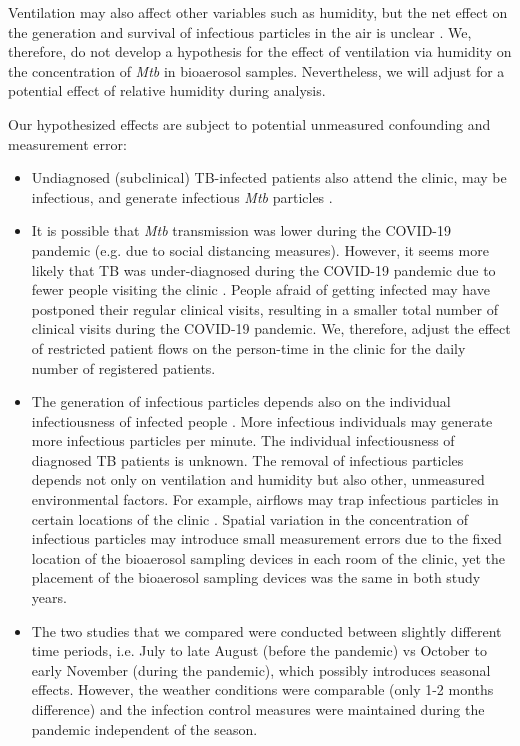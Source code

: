 \documentclass{article}
\begin{document}
Ventilation may also affect other variables such as humidity, but the net effect on the generation and survival of infectious particles in the air is unclear \cite{Wang2021Science}. We, therefore, do not develop a hypothesis for the effect of ventilation via humidity on the concentration of \emph{Mtb} in bioaerosol samples. Nevertheless, we will adjust for a potential effect of relative humidity during analysis.

Our hypothesized effects are subject to potential unmeasured confounding and measurement error: 

\begin{itemize}
    \item Undiagnosed (subclinical) TB-infected patients also attend the clinic, may be infectious, and generate infectious \emph{Mtb} particles \cite{Patterson2021Tuberculosis}. 
    \item It is possible that \emph{Mtb} transmission was lower during the COVID-19 pandemic (e.g. due to social distancing measures). However, it seems more likely that TB was under-diagnosed during the COVID-19 pandemic due to fewer people visiting the clinic \cite{Soko2021EID,Pillay2021SAMJ,Uwishema2022DMPHP}. People afraid of getting infected may have postponed their regular clinical visits, resulting in a smaller total number of clinical visits during the COVID-19 pandemic. We, therefore, adjust the effect of restricted patient flows on the person-time in the clinic for the daily number of registered patients.
    \item The generation of infectious particles depends also on the individual infectiousness of infected people \cite{Escombe2008PLoSMed}. More infectious individuals may generate more infectious particles per minute. The individual infectiousness of diagnosed TB patients is unknown.
	The removal of infectious particles depends not only on ventilation and humidity but also other, unmeasured environmental factors. For example, airflows may trap infectious particles in certain locations of the clinic \cite{Wang2021Science}. Spatial variation in the concentration of infectious particles may introduce small measurement errors due to the fixed location of the bioaerosol sampling devices in each room of the clinic, yet the placement of the bioaerosol sampling devices was the same in both study years.
    \item The two studies that we compared were conducted between slightly different time periods, i.e. July to late August (before the pandemic) vs October to early November (during the pandemic), which possibly introduces seasonal effects. However, the weather conditions were comparable (only 1-2 months difference) and the infection control measures were maintained during the pandemic independent of the season.
\end{itemize}
\end{document}
